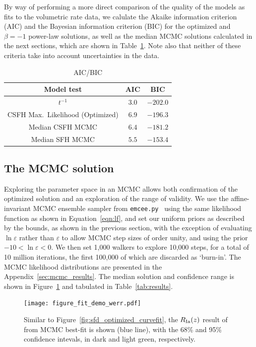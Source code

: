 \documentclass[apj, linenumbers]{aastex62}
\begin{document}
By way of performing a more direct comparison of the quality of the models as fits to the volumetric rate data, we calulate the Akaike information criterion (AIC) and the Bayesian information criterion (BIC) for the optimized and $\beta=-1$ power-law solutions, as well as the median MCMC solutions calculated in the next sections, which are shown in Table~\ref{tab:aicbic}. Note also that neither of these criteria take into account uncertainties in the data. 

\begin{table}[h]
	\centering
	\caption{AIC/BIC}
	\label{tab:aicbic}
	\begin{tabular}{ccc}
		\hline
		Model test & AIC & BIC\\
		\hline
		$t^{-1}$ & $3.0$ & $-202.0$\\
		CSFH Max.~Likelihood (Optimized)& $6.9$ & $-196.3$\\
		Median CSFH MCMC& $6.4$ & $-181.2$\\
		Median SFH MCMC& $5.5$ & $-153.4$\\
		\hline
	\end{tabular}
\end{table}

\subsection{The MCMC solution\label{sec:mcmc_sfd}}
Exploring the parameter space in an MCMC allows both confirmation of the optimized solution and an exploration of the range of validity. We use the affine-invariant MCMC ensemble sampler from {\tt emcee.py}~\citep{Foreman-Mackey:2013pd} using the same likelihood function as shown in Equation~\ref{eqn:lf}, and set our uniform priors as described by the bounds, as shown in the previous section, with the exception of evaluating $\ln \varepsilon$ rather than $\varepsilon$ to allow MCMC step sizes of order unity, and using the prior $ -10 < \ln \varepsilon < 0$. We then set 1,000 walkers to explore 10,000 steps, for a total of 10 million iterations, the first 100,000 of which are discarded as `burn-in'. The MCMC likelihood distributions are presented in the Appendix~\ref{sec:mcmc_results}. The median solution and confidence range is shown in Figure~\ref{fig:figure_fit_demo_werr} and tabulated in Table~\ref{tab:results}.
\begin{figure}[t]
   \centering
   \texttt{[image: figure\_fit\_demo\_werr.pdf]} 
   \caption{\footnotesize Similar to Figure~\ref{fig:sfd_optimized_curvefit}, the $R_{\rm Ia}(z)$ result of from MCMC best-fit is shown (blue line), with the 68\% and 95\% confidence intevals, in dark and light green, respectively. }
   \label{fig:figure_fit_demo_werr}
\end{figure}
\end{document}
